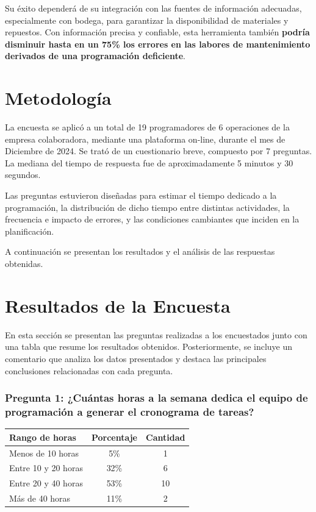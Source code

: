 \documentclass{article}
\begin{document}
\begin{appendix}
    Su éxito dependerá de su integración con las fuentes de información adecuadas, especialmente con bodega, para garantizar la disponibilidad de materiales y repuestos. Con información precisa y confiable, esta herramienta también \textbf{podría disminuir hasta en un 75\% los errores en las labores de mantenimiento derivados de una programación deficiente}.
    
    \section*{Metodología}
    
    La encuesta se aplicó a un total de 19 programadores de 6 operaciones de la empresa colaboradora, mediante una plataforma on-line, durante el mes de Diciembre de 2024. Se trató de un cuestionario breve, compuesto por 7 preguntas. La mediana del tiempo de respuesta fue de aproximadamente 5 minutos y 30 segundos. 
    
    Las preguntas estuvieron diseñadas para estimar el tiempo dedicado a la programación, la distribución de dicho tiempo entre distintas actividades, la frecuencia e impacto de errores, y las condiciones cambiantes que inciden en la planificación.
    
    A continuación se presentan los resultados y el análisis de las respuestas obtenidas.
    
    \section*{Resultados de la Encuesta}
    
    En esta sección se presentan las preguntas realizadas a los encuestados junto con una tabla que resume los resultados obtenidos. Posteriormente, se incluye un comentario que analiza los datos presentados y destaca las principales conclusiones relacionadas con cada pregunta.
    
    \vspace{.5em}
    \subsubsection*{Pregunta 1: ¿Cuántas horas a la semana dedica el equipo de programación a generar el cronograma de tareas?}
    
    
    
    \begin{table}[htbp]
        \centering
        \begin{tabular}{lcc}
            \toprule
            \textbf{Rango de horas} & \textbf{Porcentaje} & \textbf{Cantidad} \\
            \midrule
            Menos de 10 horas & 5\% & 1 \\
            Entre 10 y 20 horas & 32\% & 6 \\
            Entre 20 y 40 horas & 53\% & 10 \\
            Más de 40 horas & 11\% & 2 \\
            \bottomrule
        \end{tabular}
        \label{tab:horas_semanales}
    \end{table}
    

\end{appendix}
\end{document}
